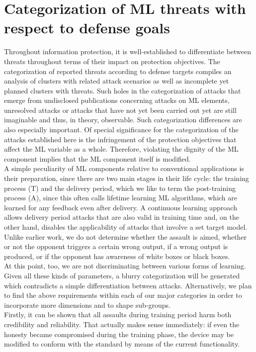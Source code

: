 \documentclass[journal,twoside,web]{ieeecolor}
\begin{document}
\section{Categorization of ML threats with respect to defense goals}
Throughout information protection, it is well-established to differentiate between threats throughout terms of their impact on protection objectives. The categorization of reported threats according to defense targets compiles an analysis of clusters with related attack scenarios as well as incomplete yet planned clusters with threats. Such holes in the categorization of attacks that emerge from undisclosed publications concerning attacks on ML elements, unresolved attacks or attacks that have not yet been carried out yet are still imaginable and thus, in theory, observable. Such categorization differences are also especially important. Of special significance for the categorization of the attacks established here is the infringement of the protection objectives that affect the ML variable as a whole. Therefore, violating the dignity of the ML component implies that the ML component itself is modified.\\
A simple peculiarity of ML components relative to conventional applications is their preparation, since there are two main stages in their life cycle: the training process (T) and the delivery period, which we like to term the post-training process (A), since this often calls lifetime learning ML algorithms, which are learned for any feedback even after delivery. A continuous learning approach allows delivery period attacks that are also valid in training time and, on the other hand, disables the applicability of attacks that involve a set target model. Unlike earlier work, we do not determine whether the assault is aimed, whether or not the opponent triggers a certain wrong output, if a wrong output is produced, or if the opponent has awareness of white boxes or black boxes.\\
At this point, too, we are not discriminating between various forms of learning. Given all these kinds of parameters, a blurry categorization will be generated which contradicts a simple differentiation between attacks. Alternatively, we plan to find the above requirements within each of our major categories in order to incorporate more dimensions and to shape sub-groups.\\
Firstly, it can be shown that all assaults during training period harm both credibility and reliability. That actually makes sense immediately: if even the honesty became compromised during the training phase, the device may be modified to conform with the standard by means of the current functionality.\\
\end{document}
